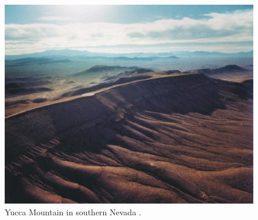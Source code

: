 \begin{figure}[htbp!]
  \begin{center}
    \includegraphics{yucca_site.eps}
  \end{center}
  \caption{Yucca Mountain in southern Nevada \cite{wherever_you_got_this}.}
  \label{fig:yucca_site}
\end{figure}

